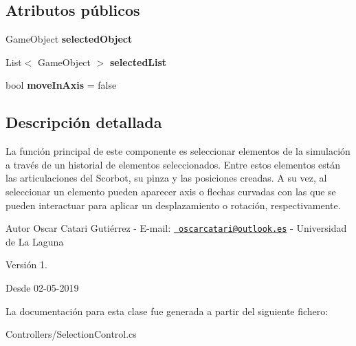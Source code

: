 \subsection*{Atributos públicos}
\begin{DoxyCompactItemize}
\item 
\mbox{\label{class_selection_control_ad7c2fe8ddd7a667218189d834d875437}} 
Game\+Object {\bfseries selected\+Object}
\item 
\mbox{\label{class_selection_control_a91300a4e40f06901799b7b582f53b398}} 
List$<$ Game\+Object $>$ {\bfseries selected\+List}
\item 
\mbox{\label{class_selection_control_a30385310a008d84dd95762f72dd31fed}} 
bool {\bfseries move\+In\+Axis} = false
\end{DoxyCompactItemize}


\subsection{Descripción detallada}
La función principal de este componente es seleccionar elementos de la simulación a través de un historial de elementos seleccionados. Entre estos elementos están las articulaciones del Scorbot, su pinza y las posiciones creadas. A su vez, al seleccionar un elemento pueden aparecer axis o flechas curvadas con las que se pueden interactuar para aplicar un desplazamiento o rotación, respectivamente. \begin{DoxyAuthor}{Autor}
Oscar Catari Gutiérrez -\/ E-\/mail\+: \href{mailto:oscarcatari@outlook.es}{\texttt{ oscarcatari@outlook.\+es}} -\/ Universidad de La Laguna 
\end{DoxyAuthor}
\begin{DoxyVersion}{Versión}
1. 
\end{DoxyVersion}
\begin{DoxySince}{Desde}
02-\/05-\/2019 
\end{DoxySince}


La documentación para esta clase fue generada a partir del siguiente fichero\+:\begin{DoxyCompactItemize}
\item 
Controllers/Selection\+Control.\+cs\end{DoxyCompactItemize}
